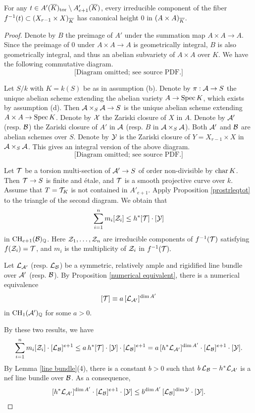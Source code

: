 \begin{pro} \label{torsion fiber}
For any $t\in A'({\overline{K}})_{\mathrm{tor}}\setminus A'_{e+1}({\overline{K}})$, every irreducible component of the fiber $f^{-1}(t)\subset (X_{r-1}\times X)_{\overline{K}}$ has canonical height 0 in $(A\times A)_{\overline{K}}$.
\end{pro}
\begin{proof}
Denote by $B$ the preimage of $A'$ under the summation map $A\times A\to A$.
Since the preimage of $0$ under $A\times A\to A$ is geometrically integral, $B$ is also geometrically integral, and thus an abelian subvariety of $A\times A$ over $K$. We have the following commutative diagram.
$$
\text{[Diagram omitted; see source PDF.]}
$$

Let $S/k$ with $K=k(S)$ be as in assumption (b).
Denote by $\pi:{\mathcal A}\to S$ the unique abelian scheme extending the abelian variety $A\to {\rm Spec \,} K$, which exists by assumption (d).
Then ${\mathcal A}\times_S{\mathcal A} \to S$ is the unique abelian scheme extending $A\times A\to {\rm Spec \,} K$.
Denote by ${\mathcal X}$ the Zariski closure of $X$ in $A$.
Denote by ${\mathcal A}'$ (resp. ${\mathcal B}$) the Zariski closure of $A'$ in ${\mathcal A}$ (resp. $B$ in ${\mathcal A}\times_S{\mathcal A}$). Both ${\mathcal A}'$ and ${\mathcal B}$ are abelian schemes over $S$.
Denote by ${\mathcal Y}$ is the Zariski closure of $Y=X_{r-1}\times X$ in ${\mathcal A}\times_S {\mathcal A}$.
This gives an integral version of the above diagram.
$$
\text{[Diagram omitted; see source PDF.]}
$$

Let ${\mathcal T}$ be a torsion multi-section of ${\mathcal A}'\to S$ of order non-divisible by ${\rm char\,} K$.
Then ${\mathcal T}\to S$ is finite and \'etale, and ${\mathcal T}$ is a smooth projective curve over $k$.
Assume that $T={\mathcal T}_K$ is not contained in $A'_{e+1}.$
Apply Proposition \ref{prostrleqtot} to the triangle of the second diagram.
We obtain that
$$\sum_{i=1}^n m_i[{\mathcal Z}_i]\leq h^*[{\mathcal T}]\cdot [{\mathcal Y}]$$
in ${\rm CH}_{e+1}({\mathcal B})_{\mathbb Q}$.
Here ${\mathcal Z}_1, \dots, {\mathcal Z}_n$ are irreducible components of $f^{-1}({\mathcal T})$ satisfying
$f({\mathcal Z}_i)={\mathcal T}$, and $m_i$ is the multiplicity of ${\mathcal Z}_i$ in $f^{-1}({\mathcal T}).$

Let ${\mathcal L}_{{\mathcal A}'}$ (resp. ${\mathcal L}_{\mathcal B}$) be a symmetric, relatively ample and rigidified line bundle over ${\mathcal A}'$ (resp. ${\mathcal B}$).
By Proposition \ref{numerical equivalent}, there is a numerical equivalence
$$[{\mathcal T}]\equiv
a\, [{\mathcal L}_{{\mathcal A}'}]^{\dim A'}$$
in ${\rm CH}_{1}({\mathcal A}')_{\mathbb Q}$ for some $a>0$.

By these two results, we have
$$\sum_{i=1}^n m_i[{\mathcal Z}_i]\cdot [{\mathcal L}_{\mathcal B}]^{e+1}
\leq a\,  h^*[{\mathcal T}]\cdot [{\mathcal Y}] \cdot [{\mathcal L}_{\mathcal B}]^{e+1}
=a\, [h^*{\mathcal L}_{{\mathcal A}'}]^{\dim A'} \cdot [{\mathcal L}_{\mathcal B}]^{e+1}\cdot [{\mathcal Y}] .$$
By Lemma \ref{line bundle}(4), there is a constant $b>0$ such that $b\, {\mathcal L}_{\mathcal B}-h^*{\mathcal L}_{{\mathcal A}'}$ is a nef line bundle over ${\mathcal B}$.
As a consequence,
$$[h^*{\mathcal L}_{{\mathcal A}'}]^{\dim A'} \cdot [{\mathcal L}_{\mathcal B}]^{e+1} \cdot [{\mathcal Y}]
\leq
b^{\dim A'}\,  [{\mathcal L}_{\mathcal B}]^{\dim {\mathcal Y}} \cdot [{\mathcal Y}].
$$


\end{proof}
